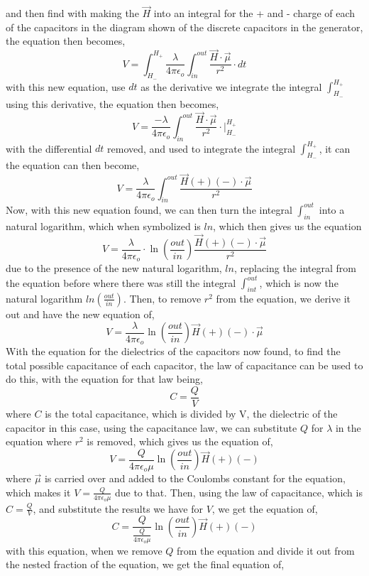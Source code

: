 \documentclass[]{article}
\begin{document}
and then find with making the $\vec{H}$ into an integral for the + and - charge of each of the capacitors in the diagram shown of the discrete capacitors in the generator, the equation then becomes,
\[V = \int_{H_-}^{H_+} \frac{\lambda}{4\pi\epsilon_o}\int_{in}^{out}\frac{\vec{H} \cdot \vec{\mu}}{r^2} \cdot dt\]
with this new equation, use $dt$ as the derivative we integrate the integral $\int_{H_-}^{H_+}$ using this derivative, the equation then becomes,
\[V = \frac{-\lambda}{4\pi\epsilon_o} \int_{in}^{out}\frac{\vec{H} \cdot \vec{\mu}}{r^2} \cdot \biggr|_{H_{-}}^{H_{+}}\]
with the differential $dt$ removed, and used to integrate the integral $\int_{H_-}^{H_+}$, it can the equation can then become,
\[V = \frac{\lambda}{4\pi\epsilon_o}\int_{in}^{out} \frac{\vec{H}(+)(-) \cdot \vec{\mu}}{r^2}\]
Now, with this new equation found, we can then turn the integral $\int_{in}^{out}$ into a natural logarithm, which when symbolized is $ln$, which then gives us the equation
\[V = \frac{\lambda}{4\pi\epsilon_o} \cdot \ln(\frac{out}{in})\frac{\vec{H}(+)(-) \cdot \vec{\mu}}{r^2}\]
due to the presence of the new natural logarithm, $ln$, replacing the integral from the equation before where there was still the integral $\int_{int}^{out}$, which is now the natural logarithm $ln(\frac{out}{in})$. Then, to remove $r^2$ from the equation, we derive it out and have the new equation of, 
\[V = \frac{\lambda}{4\pi\epsilon_o} \ln(\frac{out}{in})\vec{H}(+)(-)\cdot \vec{\mu}\]
With the equation for the dielectrics of the capacitors now found, to find the total possible capacitance of each capacitor, the law of capacitance can be used to do this, with the equation for that law being,
\[C = \frac{Q}{V} \]
where $C$ is the total capacitance, which is divided by V, the dielectric of the capacitor in this case, using the capacitance law, we can substitute $Q$ for $\lambda$ in the equation  where $r^2$ is removed, which gives us the equation of,
\begin{equation}
V = \frac{Q}{4\pi\epsilon_o\mu}\ln(\frac{out}{in})\vec{H}(+)(-)
\end{equation}
where $\vec{\mu}$ is carried over and added to the Coulombs constant for the equation, which makes it $V = \frac{Q}{4\pi\epsilon_o\mu}$ due to that. Then, using the law of capacitance, which is $C = \frac{Q}{V}$, and substitute the results we have for $V$, we get the equation of,
\begin{equation}
C = \frac{Q}{\frac{Q}{4\pi\epsilon_o\mu}}\ln(\frac{out}{in})\vec{H}(+)(-)
\end{equation}
with this equation, when we remove $Q$ from the equation and divide it out from the nested fraction of the equation, we get the final equation of,
\end{document}
